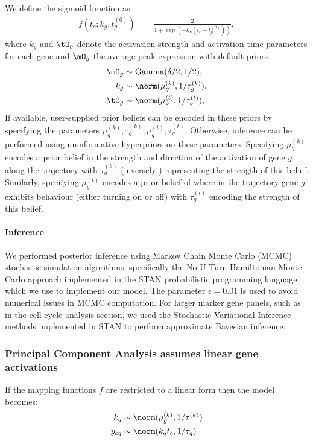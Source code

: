 We define the sigmoid function as
\begin{align}
	f(t_c;k_g,t^{(0)}_g) &= \frac{2}{1 + \exp\left(-k_g(t_c - t^{(0)}_g)\right)},
\end{align}
where $k_g$ and $\tO_g$ denote the activation strength and activation time parameters for each gene and $\mO_g$ the average peak expression
with default priors
\begin{align}
		\mO_g & \sim \mathrm{Gamma}(\delta / 2, 1 / 2), \\
		k_g & \sim \norm(\mu^{(k)}_g, 1 / \tau^{(k)}_g), \\
		\tO_g & \sim \norm(\mu^{(t)}_g, 1 / \tau^{(t)}_g),
\end{align}
If available, user-supplied prior beliefs can be encoded in these priors by specifying the parameters $\mu^{(k)}_g, \tau^{(k)}_g, \mu^{(t)}_g, \tau^{(t)}_g$. Otherwise, inference can be performed using uninformative hyperpriors on these parameters. Specifying $\mu^{(k)}_g$ encodes a prior belief in the strength and direction of the activation of gene $g$ along the trajectory with $\tau^{(k)}_g$ (inversely-) representing the strength of this belief. Similarly, specifying $\mu^{(t)}_g$ encodes a prior belief of where in the trajectory gene $g$ exhibits behaviour (either turning on or off) with $\tau^{(t)}_g$ encoding the strength of this belief.

\paragraph{Inference}

We performed posterior inference using Markov Chain Monte Carlo (MCMC) stochastic simulation algorithms, specifically the No U-Turn Hamiltonian Monte Carlo approach \cite{homan2014no} implemented in the STAN probabilistic programming language \cite{carpenter2015stan} which we use to implement our model. The parameter $\epsilon = 0.01$ is used to avoid numerical issues in MCMC computation. For larger marker gene panels, such as in the cell cycle analysis section, we used the Stochastic Variational Inference methods implemented in STAN to perform approximate Bayesian inference.

\subsubsection{Principal Component Analysis assumes linear gene activations}

If the mapping functions $f$ are restricted to a linear form then the model becomes:
\begin{equation}
	\begin{aligned}
		k_g & \sim \norm(\mu^{(k)}_g, 1 / \tau^{(k)}) \\
		y_{cg} & \sim \norm(k_g t_c, 1 / \tau_g)
	\end{aligned}
\end{equation}

